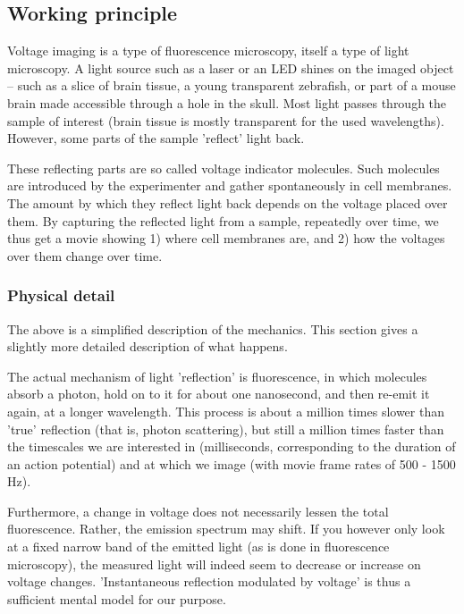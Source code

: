 \subsection{Working principle}

Voltage imaging is a type of fluorescence microscopy, itself a type of light microscopy. A light source such as a laser or an LED shines on the imaged object -- such as a slice of brain tissue, a young transparent zebrafish, or part of a mouse brain made accessible through a hole in the skull. Most light passes through the sample of interest (brain tissue is mostly transparent for the used wavelengths). However, some parts of the sample 'reflect' light back.

These reflecting parts are so called voltage indicator molecules. Such molecules are introduced by the experimenter and gather spontaneously in cell membranes. The amount by which they reflect light back depends on the voltage placed over them. By capturing the reflected light from a sample, repeatedly over time, we thus get a movie showing 1) where cell membranes are, and 2) how the voltages over them change over time.

\subsubsection{Physical detail}
The above is a simplified description of the mechanics. This section gives a slightly more detailed description of what happens.

The actual mechanism of light 'reflection' is fluorescence, in which molecules absorb a photon, hold on to it for about one nanosecond, and then re-emit it again, at a longer wavelength. This process is about a million times slower than 'true' reflection (that is, photon scattering), but still a million times faster than the timescales we are interested in (milliseconds, corresponding to the duration of an action potential) and at which we image (with movie frame rates of 500 - 1500 Hz).\cite{Valeur2012MolecularFluorescencePrinciples,Cox2019FundamentalsFluorescenceImaging}

Furthermore, a change in voltage does not necessarily lessen the total fluorescence. Rather, the emission spectrum may shift. If you however only look at a fixed narrow band of the emitted light (as is done in fluorescence microscopy), the measured light will indeed seem to decrease or increase on voltage changes.
'Instantaneous reflection modulated by voltage' is thus a sufficient mental model for our purpose.

